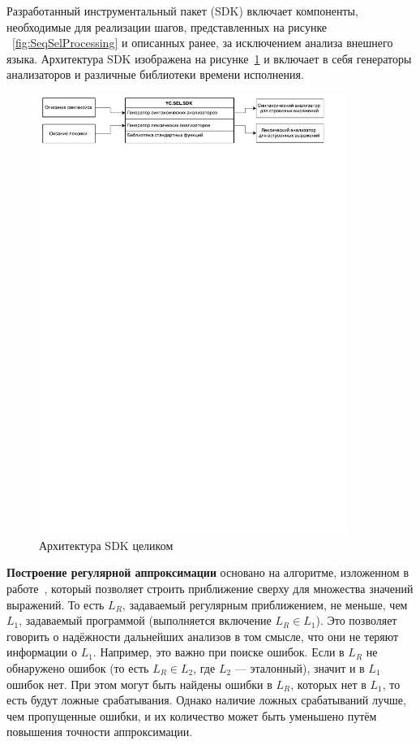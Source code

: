 Разработанный инструментальный пакет (SDK) включает компоненты, необходимые для реализации шагов, представленных на рисунке ~\ref{fig:SeqSelProcessing} и описанных ранее, за исключением анализа внешнего языка. Архитектура SDK изображена на рисунке~\ref{fig:SDKHLArch} и включает в себя генераторы анализаторов и различные библиотеки времени исполнения.

\begin{figure}[h!]
\begin{center}
\includegraphics[width=0.9\textwidth]{pics/HighLevelArch}
\caption{Архитектура SDK целиком}
\label{fig:SDKHLArch} 
\end{center}
\end{figure}

\textbf{Построение регулярной аппроксимации} основано на алгоритме, изложенном в работе~\cite{RegOverApprox}, который позволяет строить приближение сверху для множества значений выражений. То есть $L_R$, задаваемый регулярным приближением, не меньше, чем $L_1$, задаваемый программой (выполняется включение $L_R \in L_1$). Это позволяет говорить о надёжности дальнейших анализов в том смысле, что они не теряют информации о $L_1$. Например, это важно при поиске ошибок. Если в $L_R$ не обнаружено ошибок (то есть $L_R \in L_2$, где $L_2$ --- эталонный), значит и в $L_1$ ошибок нет. При этом могут быть найдены ошибки в $L_R$, которых нет в $L_1$, то есть будут ложные срабатывания. Однако наличие ложных срабатываний лучше, чем пропущенные ошибки, и их количество может быть уменьшено путём повышения точности аппроксимации. 

